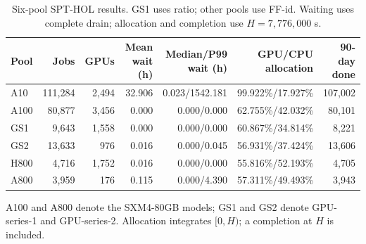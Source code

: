 \begin{table}[H]\centering
\caption{Six-pool SPT-HOL results. GS1 uses ratio; other pools use FF-id. Waiting uses complete drain; allocation and completion use $H=7{,}776{,}000$ s.}
\label{tab:r2pools}
\begin{tabular}{lrrrrrr}
\toprule
Pool & Jobs & GPUs & \shortstack{Mean\\wait (h)} & \shortstack{Median/P99\\wait (h)} & \shortstack{GPU/CPU\\allocation} & \shortstack{90-day\\done}\\
\midrule
A10 & 111,284 & 2,494 & 32.906 & 0.023/1542.181 & 99.922\%/17.927\% & 107,002\\
A100 & 80,877 & 3,456 & 0.000 & 0.000/0.000 & 62.755\%/42.032\% & 80,101\\
GS1 & 9,643 & 1,558 & 0.000 & 0.000/0.000 & 60.867\%/34.814\% & 8,221\\
GS2 & 13,633 & 976 & 0.016 & 0.000/0.045 & 56.931\%/37.424\% & 13,606\\
H800 & 4,716 & 1,752 & 0.016 & 0.000/0.000 & 55.816\%/52.193\% & 4,705\\
A800 & 3,959 & 176 & 0.115 & 0.000/4.390 & 57.311\%/49.493\% & 3,943\\
\bottomrule
\end{tabular}
\smallskip\par A100 and A800 denote the SXM4-80GB models; GS1 and GS2 denote GPU-series-1 and GPU-series-2. Allocation integrates $[0,H)$; a completion at $H$ is included.
\end{table}
